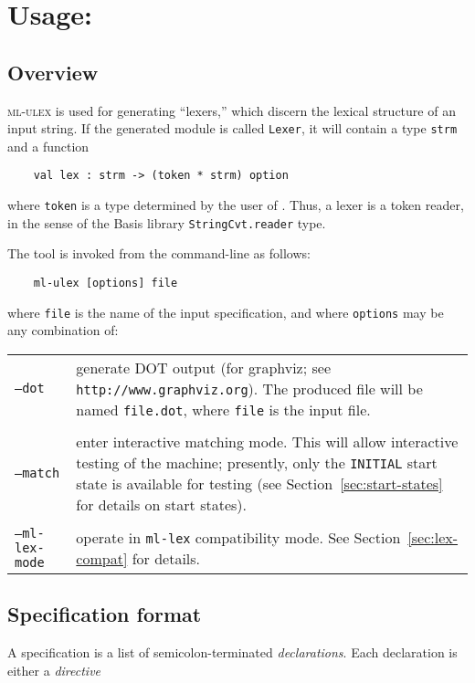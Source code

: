 \chapter[\ulex]{Usage: \ulex}

\section{Overview}

\textsc{ml-ulex} is used for generating ``lexers,'' which discern the lexical structure of an input string.  If the generated module is called {\tt Lexer}, it will contain a type {\tt strm} and a function
\begin{verbatim}
    val lex : strm -> (token * strm) option
\end{verbatim}
where {\tt token} is a type determined by the user of \ulex{}.  Thus, a lexer is a token reader, in the sense of the Basis library {\tt StringCvt.reader} type.

The tool is invoked from the command-line as follows:
\begin{verbatim}
    ml-ulex [options] file
\end{verbatim}
where {\tt file} is the name of the input \ulex{} specification, and where {\tt options} may be any combination of:

\vskip 12pt
\begin{tabular}{lp{}}
  {\tt --dot} & generate DOT output (for graphviz; see \texttt{http://www.graphviz.org}).  The produced file will be named {\tt file.dot}, where {\tt file} is the input file. \\
  \\
  {\tt --match} & enter interactive matching mode.  This will allow interactive testing of the machine; presently, only the {\tt INITIAL} start state is available for testing (see Section~\ref{sec:start-states} for details on start states).  \\
  \\
  {\tt --ml-lex-mode} & operate in {\tt ml-lex} compatibility mode.  See Section~\ref{sec:lex-compat} for details.
\end{tabular}

\section{Specification format}

A \ulex{} specification is a list of semicolon-terminated \emph{declarations}.  Each declaration is either a \emph{directive}

